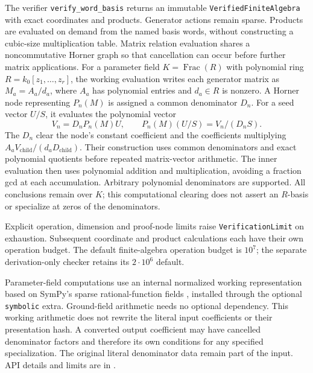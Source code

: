 \documentclass[11pt]{article}
\begin{document}
The verifier \texttt{verify\_word\_basis} returns an immutable
\texttt{VerifiedFiniteAlgebra} with exact coordinates and products.
Generator actions remain sparse. Products are evaluated on demand from the
named basis words, without constructing a cubic-size multiplication table.
Matrix relation evaluation shares a noncommutative Horner graph so that
cancellation can occur before further matrix applications.
For a parameter field $K=\operatorname{Frac}(R)$ with polynomial ring
$R=k_0[z_1,\ldots,z_r]$, the working evaluation writes each generator matrix
as $M_a=A_a/d_a$, where $A_a$ has polynomial entries and $d_a\in R$ is nonzero.
A Horner node representing $P_n(M)$ is assigned a common denominator $D_n$.
For a seed vector $U/S$, it evaluates the polynomial vector
\[
 V_n=D_nP_n(M)U,
 \qquad P_n(M)(U/S)=V_n/(D_nS).
\]
The $D_n$ clear the node's constant coefficient and the coefficients multiplying
$A_aV_{\mathrm{child}}/(d_aD_{\mathrm{child}})$. Their construction uses common
denominators and exact polynomial quotients before repeated matrix-vector
arithmetic. The inner evaluation then uses polynomial addition and
multiplication, avoiding a fraction gcd at each accumulation. Arbitrary
polynomial denominators are supported. All conclusions remain over $K$;
this computational clearing does not assert an $R$-basis or specialize at
zeros of the denominators.

Explicit operation, dimension and proof-node limits raise
\texttt{VerificationLimit} on exhaustion. Subsequent coordinate and product
calculations each have their own operation budget. The default finite-algebra
operation budget is $10^7$; the separate derivation-only checker retains its
$2\cdot10^6$ default.

Parameter-field computations use an internal normalized working representation
based on SymPy's sparse rational-function fields \cite{sympy}, installed through
the optional \texttt{symbolic} extra. Ground-field arithmetic needs no optional
dependency. This working arithmetic does not rewrite the literal input
coefficients or their presentation hash. A converted output coefficient may
have cancelled denominator factors and therefore its own conditions for any
specified specialization. The original literal denominator data remain part
of the input. API details and limits are in .
\end{document}

